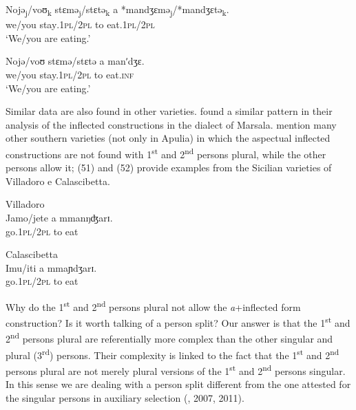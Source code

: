 \documentclass[output=paper]{langsci/langscibook}
\begin{document}
\ea%
    \label{ex:lorusso:50}
    \gll Nojə\textsubscript{j}/voʊ\textsubscript{k}   stɛmə\textsubscript{j}/stɛtə\textsubscript{k}   a       *mandʒɛmə\textsubscript{j}/*mandʒɛtə\textsubscript{k}.\\
         we/you  stay\textsc{.1pl/2pl}  to   eat.\textsc{1pl/2pl}\\
    \glt ‘We/you are eating.’
\z


\ea%
    \label{ex:lorusso:51}
    \gll Nojə/voʊ   stɛmə/stɛtə  a   manʹdʒɛ.\\
         we/you  stay.\textsc{1pl/2pl}  to   eat\textsc{.inf}\\
    \glt ‘We/you are eating.’
\z


Similar data are also found in other varieties. \citet{Cardinaletti2003} found a similar pattern in their analysis of the inflected constructions in the dialect of Marsala. \citet{Manzini2005} mention many other southern varieties (not only in Apulia) in which the aspectual inflected constructions are not found with 1\textsuperscript{st} and 2\textsuperscript{nd} persons plural, while the other persons allow it; (51) and (52) provide examples from the Sicilian varieties of Villadoro e Calascibetta.

\ea%
         Villadoro\label{ex:lorusso:52}\\
    \gll Jamo/jete   a   mmanŋʤarɪ.\\
         go.\textsc{1pl/2pl}   to  eat \\
    \z


\ea%
         Calascibetta\label{ex:lorusso:53}\\
    \gll Imu/iti   a  mmaɲdʒarɪ.  \\
         go.\textsc{1pl/2pl} to  eat \\
    \z

Why do the 1\textsuperscript{st} and 2\textsuperscript{nd} persons plural not allow the \textit{a}+inflected form construction? Is it worth talking of a person split? Our answer is that the 1\textsuperscript{st} and 2\textsuperscript{nd} persons plural are referentially more complex than the other singular and plural (3\textsuperscript{rd}) persons. Their complexity is linked to the fact that the 1\textsuperscript{st} and 2\textsuperscript{nd} persons plural are not merely plural versions of the 1\textsuperscript{st} and 2\textsuperscript{nd} persons singular. In this sense we are dealing with a person split different from the one attested for the singular persons in auxiliary selection (\citealt{Manzini2005}, 2007, 2011).
\end{document}
